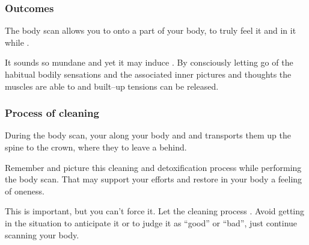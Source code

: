 \begin{frame}
\frametitle{Outcomes}


The body scan allows you to  onto a part of your body, to truly feel it and  in it while . 

It sounds so mundane and yet it may induce . By consciously letting go of the habitual bodily sensations and the associated inner pictures and thoughts the muscles are able to  and built--up tensions can be released.
\end{frame}
\begin{frame}
\frametitle{Process of cleaning}

During the body scan, your  along your body and  and transports them up the spine to the crown, where they  to leave a  behind.

Remember and picture this cleaning and detoxification process while performing the body scan. That may support your efforts and restore in your body a feeling of oneness.

This  is important, but you can't force it. Let the cleaning process . Avoid getting in the situation to anticipate it or to judge it as ``good'' or ``bad'', just continue scanning your body.
\end{frame}
